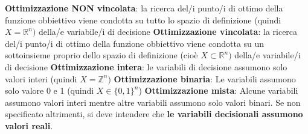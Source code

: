 \documentclass[12pt]{article}
\begin{document}
\textbf{Ottimizzazione NON vincolata}: la ricerca del/i punto/i di ottimo della funzione obbiettivo viene condotta su tutto lo spazio di definizione
(quindi $X = \mathbb{R}^n)$ della/e variabile/i di decisione \newline
\textbf{Ottimizzazione vincolata}: la ricerca del/i punto/i di ottimo della funzione obbiettivo viene condotta su un sottoinsieme proprio dello spazio di definizione
(cioè $X \subset \mathbb{R}^n)$ della/e variabile/i di decisione
\textbf{Ottimizzazione intera}: le variabili di decisione assumono solo valori interi (quindi $X = \mathbb{Z}^n)$ \newline
\textbf{Ottimizzazione binaria}: Le variabili assumono solo valore 0 e 1 (quindi $X \in \{0,1\}^n$) \newline
\textbf{Ottimizzazione mista}: Alcune variabili assumono valori interi mentre altre variabili assumono solo valori binari. \newline
Se non specificato altrimenti, si deve intendere che \textbf{le variabili decisionali assumono valori reali}.
\end{document}
